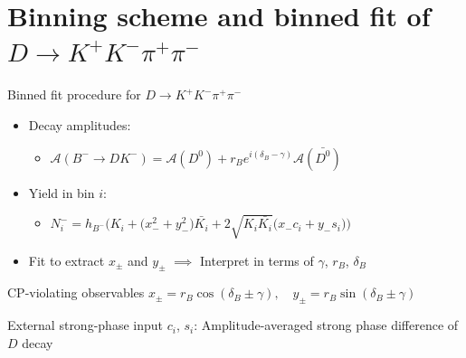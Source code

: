 \documentclass{beamer}
\begin{document}
\section{Binning scheme and binned fit of \texorpdfstring{$D\to K^+K^-\pi^+\pi^-$}{D to K+K-pi+pi-}}
\begin{frame}{Binned fit procedure for $D\to K^+K^-\pi^+\pi^-$}
  \begin{itemize}
    \setlength\itemsep{1.0em}
    \item{Decay amplitudes:}
    \begin{itemize}
      \item{$\mathcal{A}(B^-\to DK^-) = \mathcal{A}(D^0) + r_Be^{i(\delta_B - \gamma)}\mathcal{A}(\bar{D^0})$}
    \end{itemize}
    \item{Yield in bin $i$:}
    \begin{itemize}
      \item{$N^-_i = h_{B^-}\Big(K_i + \big(x_-^2 + y_-^2\big)\bar{K_i} + 2\sqrt{K_i\bar{K_i}}\big(x_-c_i + y_-s_i\big)\Big)$}
    \end{itemize}
    \item{Fit to extract $x_\pm$ and $y_\pm$ $\implies$ Interpret in terms of $\gamma$, $r_B$, $\delta_B$}
  \end{itemize}
  \begin{block}{CP-violating observables}
    $x_\pm = r_B\cos(\delta_B\pm\gamma), \quad y_\pm = r_B\sin(\delta_B\pm\gamma)$
  \end{block}
  \begin{block}{External strong-phase input}
    $c_i$, $s_i$: Amplitude-averaged strong phase difference of $D$ decay
  \end{block}
\end{frame}
\end{document}
